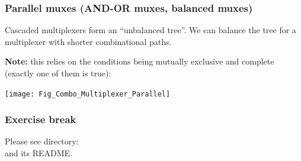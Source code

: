 
\begin{frame}[fragile]
\frametitle{Parallel muxes (AND-OR muxes, balanced muxes)}

\footnotesize

\begin{minipage}{0.25\textwidth}
 Cascaded multiplexers form an ``unbalanced tree''.  We can balance the tree
 for a multiplexer with shorter combinational paths.

 \vspace{2ex}

 {\bf Note:} this relies on the conditions being mutually exclusive and
 complete (exactly one of them is true):

\end{minipage}
\hm
\begin{minipage}{0.7\textwidth}
\begin{center}
 \texttt{[image: Fig\_Combo\_Multiplexer\_Parallel]}
\end{center}
\end{minipage}

\end{frame}


\begin{frame}[fragile]
\frametitle{\EmojiExercise \hmm Exercise break}

Please see directory:  \\
and its README.

\end{frame}


